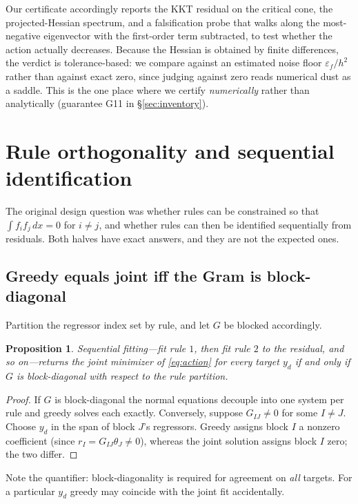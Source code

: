 \documentclass[11pt]{article}
\theoremstyle{plain}
\newtheorem{proposition}[theorem]{Proposition}
\theoremstyle{definition}
\begin{document}
Our certificate accordingly reports the KKT residual on the critical cone, the
projected-Hessian spectrum, and a falsification probe that walks along the
most-negative eigenvector with the first-order term subtracted, to test whether
the action actually decreases. Because the Hessian is obtained by finite
differences, the verdict is tolerance-based: we compare against an estimated
noise floor $\varepsilon_f/h^{2}$ rather than against exact zero, since judging
against zero reads numerical dust as a saddle. This is the one place where we
certify \emph{numerically} rather than analytically (guarantee G11 in
\S\ref{sec:inventory}).

\section{Rule orthogonality and sequential identification}
\label{sec:orthogonality}

The original design question was whether rules can be constrained so that
$\int f_i f_j\,dx=0$ for $i\ne j$, and whether rules can then be identified
sequentially from residuals. Both halves have exact answers, and they are not
the expected ones.

\subsection{Greedy equals joint iff the Gram is block-diagonal}

Partition the regressor index set by rule, and let $G$ be blocked accordingly.

\begin{proposition}
\label{prop:greedy}
Sequential fitting---fit rule $1$, then fit rule $2$ to the residual, and so
on---returns the joint minimizer of \eqref{eq:action} for \emph{every} target
$y_d$ if and only if $G$ is block-diagonal with respect to the rule partition.
\end{proposition}

\begin{proof}
If $G$ is block-diagonal the normal equations decouple into one system per rule
and greedy solves each exactly. Conversely, suppose $G_{IJ}\ne0$ for some
$I\ne J$. Choose $y_d$ in the span of block $J$'s regressors. Greedy assigns
block $I$ a nonzero coefficient (since $r_I=G_{IJ}\theta_J\ne0$), whereas the
joint solution assigns block $I$ zero; the two differ.
\end{proof}

Note the quantifier: block-diagonality is required for agreement on
\emph{all} targets. For a particular $y_d$ greedy may coincide with the joint
fit accidentally.
\end{document}
